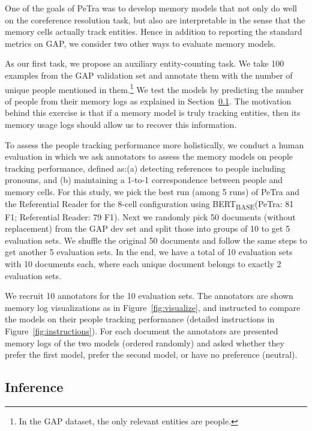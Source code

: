 \documentclass[12pt]{thesis-umich}[thesis]
\newcommand{\bertbase}{BERT\textsubscript{BASE}\xspace}
\begin{document}
 \label{sec:exp_people_tracking_eval}
One of the goals of PeTra was to develop memory models that not only do well on the coreference resolution task, but also are interpretable in the sense that the memory cells actually track entities. Hence in addition to reporting the standard metrics on GAP, we consider two other ways to evaluate memory models. 

  As our first task, we propose an auxiliary entity-counting task. We take 100 examples from the GAP validation set and annotate them
with the number of unique people mentioned in them.\footnote{In the GAP dataset, the only relevant entities are people.}
We test the models by predicting the number of people from their memory logs as explained in Section~\ref{sec:inference}.
The motivation behind this exercise is that if a memory model is truly tracking entities, then its memory usage logs should allow us to recover  this information.

To assess the people tracking performance more holistically, we conduct a human evaluation in which we ask annotators to assess the memory models on people tracking performance, defined as:(a) detecting references to people including pronouns, and (b) maintaining a 1-to-1 correspondence between people and memory cells.
For this study, we pick the best run (among 5 runs) of PeTra and the Referential Reader for the 8-cell configuration using \bertbase (PeTra: 81 F1; Referential Reader: 79 F1).
Next we randomly pick 50 documents (without replacement) from the GAP dev set and split those into groups of 10 to get 5 evaluation sets.
We shuffle the original 50 documents and follow the same steps to get another 5 evaluation sets.
In the end, we have a total of 10 evaluation sets with 10 documents each, where each unique document belongs to exactly 2 evaluation sets.

We recruit 10 annotators for the 10 evaluation sets.
The annotators are shown memory log visualizations as in Figure~\ref{fig:visualize}, and instructed to compare the models on their people tracking performance (detailed instructions in Figure~\ref{fig:instructions}). For each document the annotators are presented memory logs of the two models (ordered randomly) and asked whether they prefer the first model, prefer the second model, or have no preference
(neutral). 


\subsection{Inference}
\label{sec:inference}
\end{document}
